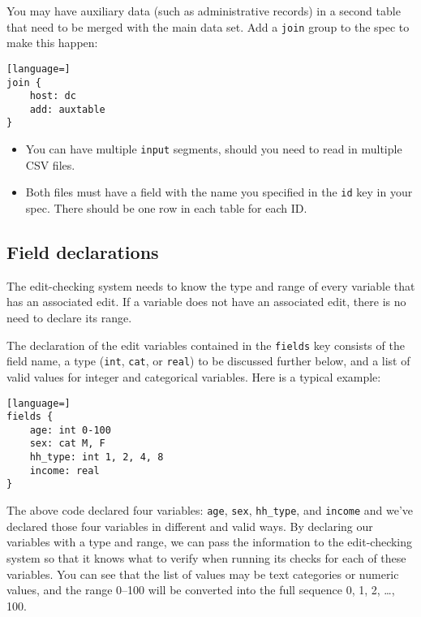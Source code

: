 \documentclass{article}
\begin{document}
You may have auxiliary data (such as administrative records) in a second table that need
to be merged with the main data set. Add a {\tt join} group to the spec to make this
happen:

\begin{lstlisting}[language=]
join {
    host: dc
    add: auxtable
}
\end{lstlisting}

\begin{itemize}
\item You can have multiple {\tt input} segments, should you need to read in multiple CSV
files.
\item Both files must have a field with the name you specified in the {\tt id} key in your
spec. There should be one row in each table for each ID.
\end{itemize}


\subsection{Field declarations} The edit-checking system needs to know the type and range
of every variable that has an associated edit. If a variable does not have an associated
edit, there is no need to declare its range.

The declaration of the edit variables contained in the {\tt fields} key consists of the field name, 
a type ({\tt int}, {\tt cat}, or 
{\tt real}) to be discussed further below, and a list of valid values for integer and categorical variables. Here is a typical example:

\begin{lstlisting}[language=]
fields {
    age: int 0-100
    sex: cat M, F
    hh_type: int 1, 2, 4, 8
    income: real
}
\end{lstlisting}

The above code declared four variables: {\tt age}, {\tt sex}, {\tt hh\_type}, and
{\tt income} and we've declared those four variables in different and valid ways.
By declaring our variables with a type and range, we can pass the information to the
edit-checking system so that it knows what to verify when running its checks for each
of these variables.  You can see that the list of values may be text categories or
numeric values, and the range 0--100 will be converted into the full sequence 0, 1,
2, \dots, 100.
\end{document}
